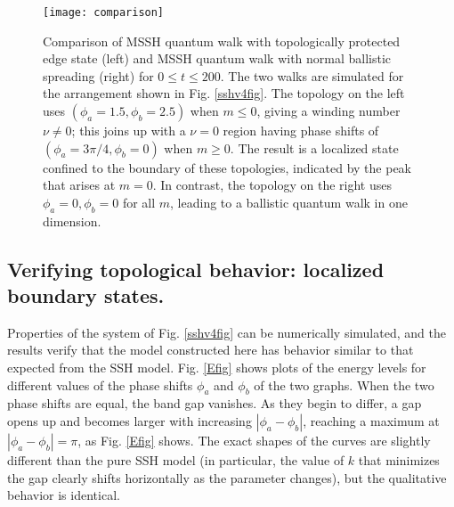 \documentclass[twocolumn,amsmath, amssymb, superscriptaddress, pra]{revtex4}
\begin{document}
\begin{figure*}
\centering
\texttt{[image: comparison]}
\caption{Comparison of MSSH quantum walk with topologically protected edge state (left) and MSSH quantum walk with normal ballistic spreading (right) for $0\leq
t \leq 200$. The two walks are simulated for the arrangement shown in Fig. \ref{sshv4fig}. The topology on the left uses $(\phi_{a}=1.5, \phi_{b}=2.5)$ when
$m\leq 0$, giving a winding number $\nu\ne 0$; this joins up with a $\nu=0$ region having phase shifts of $(\phi_{a}=3\pi/4, \phi_{b}=0)$ when $m\geq 0$. The
result is a localized state confined to the boundary of these topologies, indicated by the peak that arises at $m=0$. In contrast, the topology on the right uses
$\phi_{a}=0, \phi_{b}=0$ for all $m$, leading to a ballistic quantum walk in one dimension.} \label{topo}
\end{figure*}





\subsection{Verifying topological behavior: localized boundary states.}
Properties of the system of Fig. \ref{sshv4fig} can be numerically simulated,
and the results verify that the model constructed here has behavior similar
to that expected from the SSH model. Fig. \ref{Efig} shows plots of the
energy levels for different values of the phase shifts $\phi_a$ and $\phi_b$
of the two graphs. When the two phase shifts are equal, the band gap
vanishes. As they begin to differ, a gap opens up and becomes larger with
increasing $|\phi_a-\phi_b|$, reaching a maximum at $|\phi_a-\phi_b|=\pi$, as
Fig. \ref{Efig} shows. The exact shapes of the curves are slightly different
than the pure SSH model (in particular, the value of $k$ that minimizes the
gap clearly shifts horizontally as the parameter changes), but the
qualitative behavior is identical.
\end{document}
